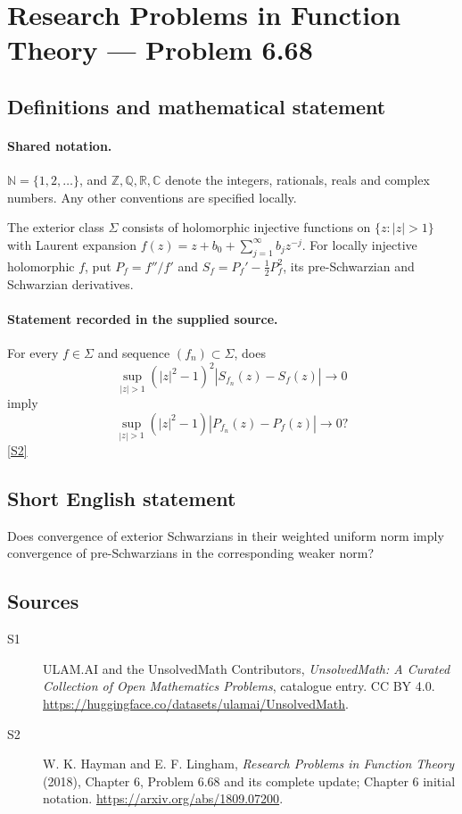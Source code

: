 \documentclass[11pt]{article}
\newcommand{\sref}[2]{\hyperlink{source:#1:#2}{[S#2]}}
\begin{document}
\section{Research Problems in Function Theory — Problem 6.68}\label{statement}

\subsection{Definitions and mathematical statement}

\paragraph{Shared notation.}$\mathbb N=\{1,2,\ldots\}$, and $\mathbb Z,\mathbb Q,\mathbb R,\mathbb C$ denote the integers, rationals, reals and complex numbers. Any other conventions are specified locally.


The exterior class $\Sigma$ consists of holomorphic injective functions on $\{z:|z|>1\}$ with Laurent expansion $f(z)=z+b_0+\sum_{j=1}^{\infty}b_jz^{-j}$. For locally injective holomorphic $f$, put $P_f=f''/f'$ and $S_f=P_f'-\tfrac12P_f^2$, its pre-Schwarzian and Schwarzian derivatives.
\paragraph{Statement recorded in the supplied source.}
For every $f\in\Sigma$ and sequence $(f_n)\subset\Sigma$, does \[\sup_{|z|>1}(|z|^2-1)^2|S_{f_n}(z)-S_f(z)|\longrightarrow0\] imply \[\sup_{|z|>1}(|z|^2-1)|P_{f_n}(z)-P_f(z)|\longrightarrow0?\] \sref{statement}{2}
\subsection{Short English statement}
Does convergence of exterior Schwarzians in their weighted uniform norm imply convergence of pre-Schwarzians in the corresponding weaker norm?
\subsection{Sources}
\begin{description}
\item[\hypertarget{source:statement:1}{S1}] ULAM.AI and the UnsolvedMath Contributors, \emph{UnsolvedMath: A Curated Collection of Open Mathematics Problems}, catalogue entry. CC BY 4.0. \url{https://huggingface.co/datasets/ulamai/UnsolvedMath}.
\item[\hypertarget{source:statement:2}{S2}] W. K. Hayman and E. F. Lingham, \emph{Research Problems in Function Theory} (2018), Chapter 6, Problem 6.68 and its complete update; Chapter 6 initial notation. \url{https://arxiv.org/abs/1809.07200}.
\end{description}
\label{end:statement}
\end{document}
